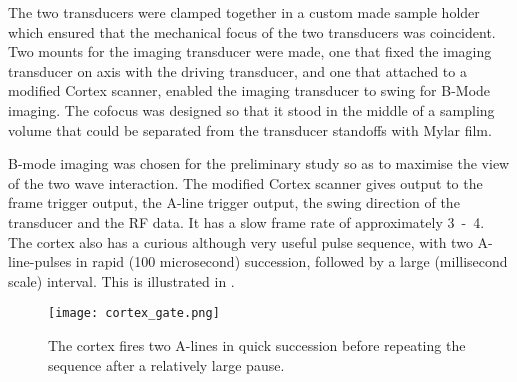 
The two transducers were clamped together in a custom made sample holder which ensured that the mechanical focus of the two transducers was coincident.  
Two mounts for the imaging transducer were made, one that fixed the imaging transducer on axis with the driving transducer, and one that attached to a modified Cortex scanner, enabled the imaging transducer to swing for B-Mode imaging.
The cofocus was designed so that it stood in the middle of a sampling volume that could be separated from the transducer standoffs with Mylar film.  


B-mode imaging was chosen for the preliminary study
so as to  maximise the view of the two wave interaction.
The modified  Cortex scanner gives output to the frame trigger output, the
A-line trigger output, the swing
direction  of the transducer and the RF data.
It has a slow frame rate of  approximately \unit{3-4}\hertz.
The cortex also has a curious although very useful pulse sequence, with two
A-line-pulses in rapid (100 microsecond) succession, followed by a large (millisecond
scale) interval.
This is illustrated in .

\begin{figure}[h]
     \centering
          \texttt{[image: cortex\_gate.png]}
     \caption{The cortex fires two A-lines in quick succession before
       repeating the sequence after a
     relatively large pause.}
          \label{fig:exp:cortex_gate}
\end{figure}

